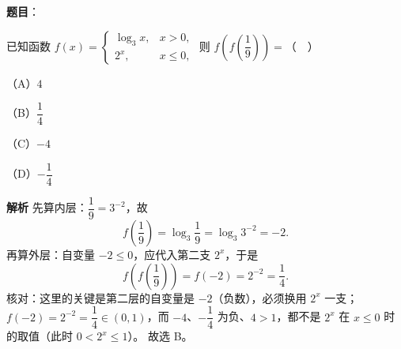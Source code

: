 \begin{answer}

\textbf{题目}：

已知函数 $f(x)=\begin{cases}\log_3 x,&x>0,\\2^x,&x\leqslant0,\end{cases}$ 则 $f\left(f\left(\dfrac19\right)\right)=$（　）

（A）$4$

（B）$\dfrac14$

（C）$-4$

（D）$-\dfrac14$

\textbf{解析}
先算内层：$\dfrac19=3^{-2}$，故
\nopagebreak[4]
\[f\left(\frac19\right)=\log_3\frac19=\log_3 3^{-2}=-2.\]
再算外层：自变量 $-2\leqslant0$，应代入第二支 $2^x$，于是
\nopagebreak[4]
\[f\left(f\left(\frac19\right)\right)=f(-2)=2^{-2}=\frac14.\]
核对：这里的关键是第二层的自变量是 $-2$（负数），必须换用 $2^x$ 一支；$f(-2)=2^{-2}=\dfrac{1}{4}\in(0,1)$，而 $-4$、$-\dfrac14$ 为负、$4>1$，都不是 $2^x$ 在 $x\leqslant0$ 时的取值（此时 $0<2^x\leqslant1$）。
故选 B。


\end{answer}

